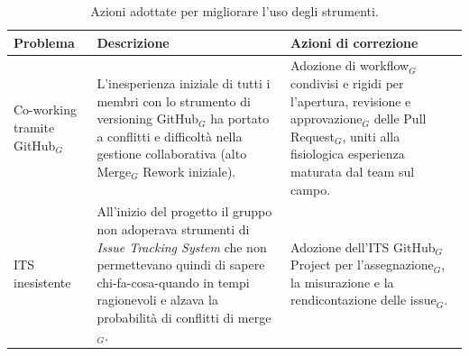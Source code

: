 \documentclass[a4paper, 10pt, colorlinks=true, linkcolor=black, urlcolor=blue, citecolor=blue, hidelinks]{article}
\begin{document}
\begin{table}[H]
    \centering
    \renewcommand{\arraystretch}{1.5}
    \begin{tabularx}{\textwidth}{|>{\raggedright\arraybackslash}p{3.5cm}|>{\raggedright\arraybackslash}X|>{\raggedright\arraybackslash}X|}
        \hline
        \textbf{Problema} & \textbf{Descrizione} & \textbf{Azioni di correzione} \\ \hline
        
        Co-working tramite GitHub$_G$ & L'inesperienza iniziale di tutti i membri con lo strumento di versioning GitHub$_G$ ha portato a conflitti e difficoltà nella gestione collaborativa (alto Merge$_G$ Rework iniziale). & Adozione di workflow$_G$ condivisi e rigidi per l'apertura, revisione e approvazione$_G$ delle Pull Request$_G$, uniti alla fisiologica esperienza maturata dal team sul campo. \\ \hline
        
        ITS inesistente & All'inizio del progetto il gruppo non adoperava strumenti di \textit{Issue Tracking System} che non permettevano quindi di sapere chi-fa-cosa-quando in tempi ragionevoli e alzava la probabilità di conflitti di merge$_G$. & Adozione dell'ITS GitHub$_G$ Project per l'assegnazione$_G$, la misurazione e la rendicontazione delle issue$_G$. \\ \hline
    \end{tabularx}
    \caption{Azioni adottate per migliorare l'uso degli strumenti.}
    \label{tab:azioni-str}
\end{table}
\end{document}
